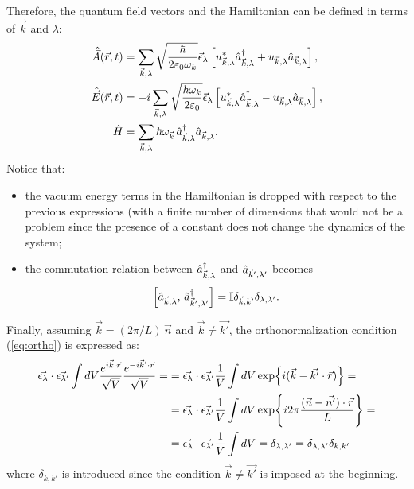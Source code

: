 Therefore, the quantum field vectors and the Hamiltonian can be defined in terms of $\vec{k}$ and $\lambda$:
\begin{align}
     \hat{\vec{A}}(\vec{r}, t) &= \sum\limits_{\vec{k}, \lambda} \sqrt{\frac{\hbar}{2 \varepsilon_{0} \omega_{k}}} \vec{\epsilon}_\lambda \left[ u_{\vec{k}, \lambda}^* \hat{a}^{\dagger}_{\vec{k}, \lambda}   + u_{\vec{k}, \lambda} \hat{a}_{\vec{k}, \lambda} \right], \label{eq:potvec}\\
     \hat{\vec{E}}(\vec{r}, t) &= -i \sum\limits_{\vec{k}, \lambda} \sqrt{\frac{\hbar \omega_k}{2 \varepsilon_0}} \vec{\epsilon}_{\lambda} \left[u_{\vec{k}, \lambda}^* \hat{a}^{\dagger}_{\vec{k}, \lambda}  - u_{\vec{k}, \lambda} \hat{a}_{\vec{k}, \lambda} \right], \label{eq:elfield}\\
     \hat{H} &= \sum\limits_{\vec{k}, \lambda} \hbar \omega_{\vec{k}} \, \hat{a}^{\dagger}_{\vec{k}, \lambda} \hat{a}_{\vec{k}, \lambda}. \label{eq:Hlight }
\end{align}
Notice that: 
\begin{itemize}
    \item the vacuum energy terms in the Hamiltonian is dropped with respect to the previous expressions (with a  finite number of dimensions that would not be a problem since the presence of a constant does not change the dynamics of the system; 
    \item the commutation relation between $\hat{a}^{\dagger}_{\vec{k}, \lambda}$ and $\hat{a}_{\vec{k}', \lambda'}$ becomes 
    \begin{equation}
        \left[\hat{a}_{\vec{k}, \lambda}, \, \hat{a}^{\dagger}_{\vec{k}', \lambda'}\right] = \mathbb{I} \delta_{\vec{k}, \vec{k'}} \delta_{\lambda, \lambda'}.
    \end{equation}
\end{itemize}

Finally, assuming $\vec{k} = (2 \pi/ L)\, \vec{n}$ and $\vec{k} \neq \vec{k'}$, the orthonormalization condition (\ref{eq:ortho}) is expressed as:
\begin{align*}
    \vec{\epsilon_{\lambda}} \cdot \vec{\epsilon_{\lambda'}} \int dV \frac{e^{i \vec{k} \cdot \vec{r}}}{\sqrt{V}} \frac{e^{-i\vec{k}'\cdot\vec{r}}}{\sqrt{V}} =
    &= \vec{\epsilon_{\lambda}} \cdot \vec{\epsilon_{\lambda'}}  \frac{1}{V} \int dV \exp{i(\vec{k}-\vec{k'} \cdot \vec{r})} =\\
    &= \vec{\epsilon_{\lambda}} \cdot \vec{\epsilon_{\lambda'}}  \frac{1}{V} \int dV \exp{i 2 \pi  \frac{(\vec{n} - \vec{n'}) \cdot \vec{r}}{L}  } = \\
    &= \vec{\epsilon_{\lambda}} \cdot \vec{\epsilon_{\lambda'}}  \frac{1}{V} \int dV  = \delta_{\lambda, \lambda'} = \delta_{\lambda, \lambda'} \delta_{k, k'}
\end{align*}
where $\delta_{k, k'}$ is introduced since the condition $\vec{k} \neq \vec{k'}$ is imposed at the beginning. \\

